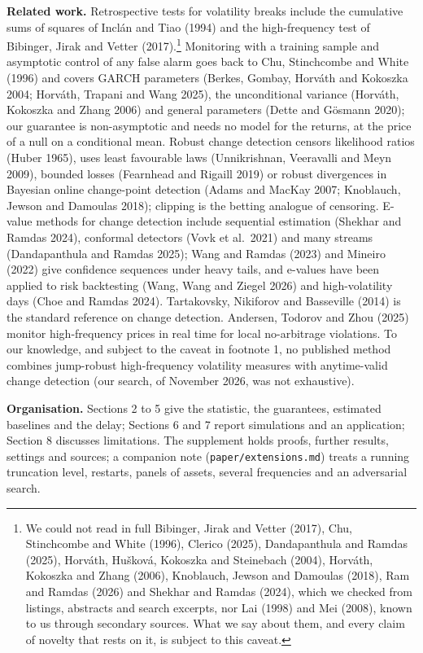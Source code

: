 \documentclass[
]{article}
\begin{document}
\textbf{Related work.} Retrospective tests for volatility breaks include
the cumulative sums of squares of Inclán and Tiao (1994) and the
high-frequency test of Bibinger, Jirak and Vetter (2017).\footnote{We
  could not read in full Bibinger, Jirak and Vetter (2017), Chu,
  Stinchcombe and White (1996), Clerico (2025), Dandapanthula and Ramdas
  (2025), Horváth, Hušková, Kokoszka and Steinebach (2004), Horváth,
  Kokoszka and Zhang (2006), Knoblauch, Jewson and Damoulas (2018), Ram
  and Ramdas (2026) and Shekhar and Ramdas (2024), which we checked from
  listings, abstracts and search excerpts, nor Lai (1998) and Mei
  (2008), known to us through secondary sources. What we say about them,
  and every claim of novelty that rests on it, is subject to this
  caveat.} Monitoring with a training sample and asymptotic control of
any false alarm goes back to Chu, Stinchcombe and White (1996) and
covers GARCH parameters (Berkes, Gombay, Horváth and Kokoszka 2004;
Horváth, Trapani and Wang 2025), the unconditional variance (Horváth,
Kokoszka and Zhang 2006) and general parameters (Dette and Gösmann
2020); our guarantee is non-asymptotic and needs no model for the
returns, at the price of a null on a conditional mean. Robust change
detection censors likelihood ratios (Huber 1965), uses least favourable
laws (Unnikrishnan, Veeravalli and Meyn 2009), bounded losses (Fearnhead
and Rigaill 2019) or robust divergences in Bayesian online change-point
detection (Adams and MacKay 2007; Knoblauch, Jewson and Damoulas 2018);
clipping is the betting analogue of censoring. E-value methods for
change detection include sequential estimation (Shekhar and Ramdas
2024), conformal detectors (Vovk et al.~2021) and many streams
(Dandapanthula and Ramdas 2025); Wang and Ramdas (2023) and Mineiro
(2022) give confidence sequences under heavy tails, and e-values have
been applied to risk backtesting (Wang, Wang and Ziegel 2026) and
high-volatility days (Choe and Ramdas 2024). Tartakovsky, Nikiforov and
Basseville (2014) is the standard reference on change detection.
Andersen, Todorov and Zhou (2025) monitor high-frequency prices in real
time for local no-arbitrage violations. To our knowledge, and subject to
the caveat in footnote 1, no published method combines jump-robust
high-frequency volatility measures with anytime-valid change detection
(our search, of November 2026, was not exhaustive).

\textbf{Organisation.} Sections 2 to 5 give the statistic, the
guarantees, estimated baselines and the delay; Sections 6 and 7 report
simulations and an application; Section 8 discusses limitations. The
supplement holds proofs, further results, settings and sources; a
companion note (\texttt{paper/extensions.md}) treats a running
truncation level, restarts, panels of assets, several frequencies and an
adversarial search.
\end{document}
